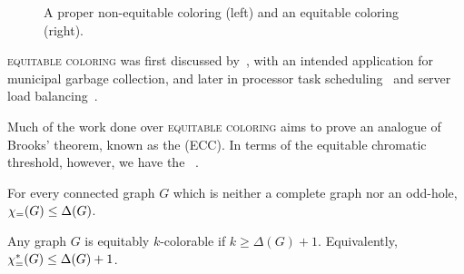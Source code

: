 \begin{figure}[!htb]
    \centering
    \hfill
    \hfill
    
    \caption{A proper non-equitable coloring (left) and an equitable coloring (right).}
    \label{fig:eq_color}
\end{figure}


\textsc{equitable coloring} was first discussed by~\citep{first_equitable}, with an intended application for municipal garbage collection, and later in processor task scheduling~\citep{mutual_exclusion_scheduling} and server load balancing~\citep{domain_decomposition}.

Much of the work done over \textsc{equitable coloring} aims to prove an analogue of Brooks' theorem, known as the  (ECC).
In terms of the equitable chromatic threshold, however, we have the ~\citep{hajnal_szmeredi_theorem}.

\begin{conjecture*}[ECC]
    For every connected graph $G$ which is neither a complete graph nor an odd-hole, $\chi_{\mathcal{=}}(G) \leq \Delta(G)$.
\end{conjecture*}

\begin{theorem*}
    Any graph $G$ is equitably $k$-colorable if $k \geq \Delta(G) + 1$. Equivalently, $\chi_{\mathcal{=}}^*(G) \leq \Delta(G) + 1$.
\end{theorem*}

